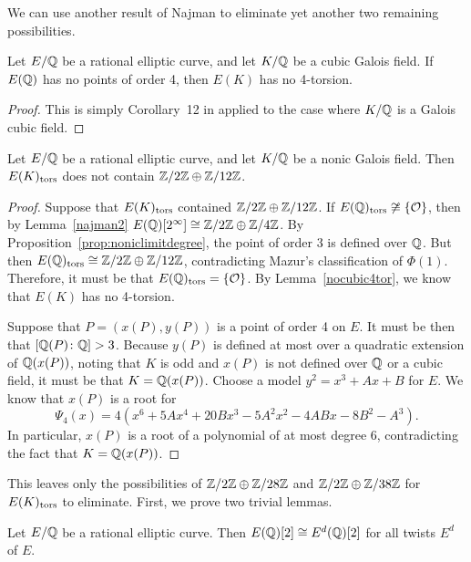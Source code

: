 We can use another result of Najman to eliminate yet another two remaining possibilities.


\begin{lem} \label{nocubic4tor}
Let $E/\mathbb{Q}$ be a rational elliptic curve, and let $K/\mathbb{Q}$ be a cubic Galois field. If $E(\mathbb{Q})$ has no points of order 4, then $E(K)$ has no 4-torsion.
\end{lem}

\begin{proof}
This is simply Corollary~12 in \cite{najman16} applied to the case where $K/\mathbb{Q}$ is a Galois cubic field. 
\end{proof}


\begin{lem} \label{nononic12}
Let $E/\mathbb{Q}$ be a rational elliptic curve, and let $K/\mathbb{Q}$ be a nonic Galois field. Then $E(K)_{\text{tors}}$ does not contain $\mathbb{Z}/2\mathbb{Z} \oplus \mathbb{Z}/12\mathbb{Z}$.
\end{lem}

\begin{proof}
Suppose that $E(K)_{\text{tors}}$ contained $\mathbb{Z}/2\mathbb{Z} \oplus \mathbb{Z}/12\mathbb{Z}$. If $E(\mathbb{Q})_{\text{tors}} \not\cong \{ \mathcal{O} \}$, then by Lemma~\ref{najman2} $E(\mathbb{Q})[2^\infty] \cong \mathbb{Z}/2\mathbb{Z} \oplus \mathbb{Z}/4\mathbb{Z}$. By Proposition~\ref{prop:noniclimitdegree}, the point of order 3 is defined over $\mathbb{Q}$. But then $E(\mathbb{Q})_{\text{tors}} \cong \mathbb{Z}/2\mathbb{Z} \oplus \mathbb{Z}/12\mathbb{Z}$, contradicting Mazur's classification of $\Phi(1)$. Therefore, it must be that $E(\mathbb{Q})_{\text{tors}}= \{ \mathcal{O} \}$. By Lemma~\ref{nocubic4tor}, we know that $E(K)$ has no 4-torsion. 

Suppose that $P= (x(P), y(P))$ is a point of order 4 on $E$. It must be then that $[\mathbb{Q}(P) \colon \mathbb{Q}] > 3$. Because $y(P)$ is defined at most over a quadratic extension of $\mathbb{Q}(x(P))$, noting that $K$ is odd and $x(P)$ is not defined over $\mathbb{Q}$ or a cubic field, it must be that $K= \mathbb{Q}(x(P))$. Choose a model $y^2= x^3 + Ax + B$ for $E$. We know that $x(P)$ is a root for 
	\[
	\Psi_4(x)= 4(x^6 + 5Ax^4 + 20Bx^3 - 5A^2x^2 - 4ABx - 8B^2 - A^3).
	\]
In particular, $x(P)$ is a root of a polynomial of at most degree 6, contradicting the fact that $K= \mathbb{Q}(x(P))$.
\end{proof}


This leaves only the possibilities of $\mathbb{Z}/2\mathbb{Z} \oplus \mathbb{Z}/28\mathbb{Z}$ and $\mathbb{Z}/2\mathbb{Z} \oplus \mathbb{Z}/38\mathbb{Z}$ for $E(K)_{\text{tors}}$ to eliminate. First, we prove two trivial lemmas.


\begin{lem} \label{rat2tortwist}
Let $E/\mathbb{Q}$ be a rational elliptic curve. Then $E(\mathbb{Q})[2] \cong E^d(\mathbb{Q})[2]$ for all twists $E^d$ of $E$. 
\end{lem}

